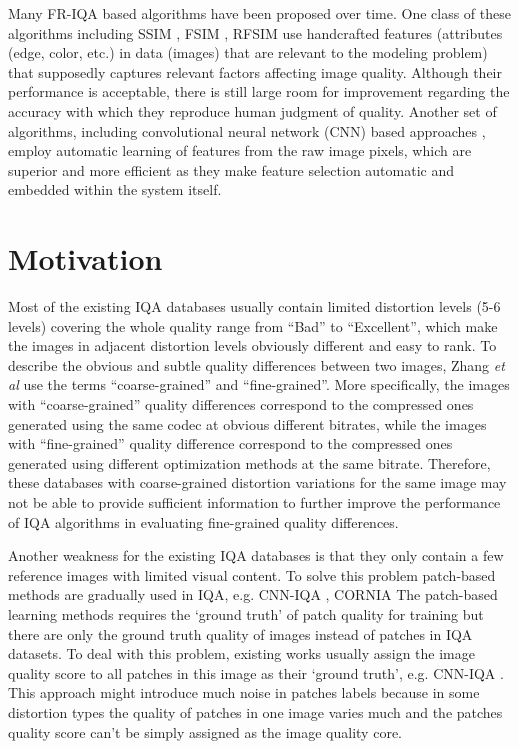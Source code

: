Many FR-IQA based algorithms have been proposed over time. One class of these
algorithms including SSIM \cite{Wang2012}, FSIM \cite{Zhang2011}, RFSIM \cite{Zhang2010} use handcrafted features (attributes (edge, color, etc.) in data (images) that are relevant to the
modeling problem) that supposedly captures relevant factors affecting image quality. 
Although their performance is acceptable, there is still large room for improvement regarding the accuracy with which they reproduce human judgment of quality. 
Another set of algorithms, including convolutional neural network
(CNN) based approaches \cite{Bosse2018,Kang2015}, employ automatic learning of features from the
raw image pixels, which are superior and more efficient as they make feature selection automatic and embedded within the system itself.

\section{Motivation}

Most of the existing IQA
databases usually contain limited distortion levels (5-6 levels)
covering the whole quality range from \enquote{Bad} to \enquote{Excellent},
which make the images in adjacent distortion levels obviously
different and easy to rank. 
To describe the obvious and subtle quality differences between two images, Zhang \textit{et al} \cite{Zhang2019} use
the terms \enquote{coarse-grained} and \enquote{fine-grained}.
More specifically, the images with \enquote{coarse-grained} quality differences correspond to the compressed ones generated using the same codec at obvious different bitrates, while the images with \enquote{fine-grained} quality difference correspond to the compressed ones generated using
different optimization methods at the same bitrate. 
Therefore, these databases with coarse-grained distortion variations
for the same image may not be able to provide sufficient
information to further improve the performance of IQA algorithms in evaluating fine-grained quality differences. 

Another weakness for the existing IQA databases is that
they only contain a few reference images with limited visual content. 
To solve this problem patch-based methods are gradually used in IQA, e.g. CNN-IQA \cite{Kang2014}, CORNIA \cite{Ye2012}
The patch-based learning methods requires the \enquote*{ground truth} of patch quality for training
but there are only the ground truth quality of images instead
of patches in IQA datasets.
To deal with this problem, existing works usually assign the image quality score to all patches
in this image as their \enquote*{ground truth}, e.g. CNN-IQA \cite{Kang2014}. 
This approach might introduce much noise in patches labels because in some distortion types the quality of patches in one
image varies much and the patches quality score can’t be
simply assigned as the image quality core. 

